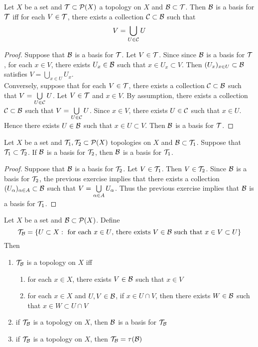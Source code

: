 \documentclass{book}
\begin{document}
	\begin{ex} 
	Let $X$ be a set and $\mathcal{T} \subset \mathcal{P}(X)$ a topology on $X$ and $\mathcal{B} \subset \mathcal{T}$. Then $\mathcal{B}$ is a basis for $\mathcal{T}$ iff for each $V \in \mathcal{T}$, there exists a collection $\mathcal{C} \subset \mathcal{B}$ such that $$V = \bigcup\limits_{U \in \mathcal{C}} U$$
	\end{ex}
	
	\begin{proof}
	Suppose that $\mathcal{B}$ is a basis for $\mathcal{T}$. Let $V \in \mathcal{T}$. Since since $\mathcal{B}$ is a basis for $\mathcal{T}$, for each $x \in V$, there exists $U_x \in \mathcal{B}$ such that $x \in U_x \subset V$. Then $(U_x)_{x \in U} \subset \mathcal{B}$ satisfies $V = \bigcup\limits_{x \in U} U_x$. \\
	Conversely, suppose that for each $V \in \mathcal{T}$, there exists a collection $\mathcal{C} \subset \mathcal{B}$ such that $V = \bigcup\limits_{U \in \mathcal{C}} U$. Let $V \in \mathcal{T}$ and $x \in V$. By assumption, there exists a collection $\mathcal{C} \subset \mathcal{B}$ such that $V = \bigcup\limits_{U \in \mathcal{C}} U$. Since $x \in V$, there exists $U \in \mathcal{C}$ such that $x \in U$. Hence there exists $U \in \mathcal{B}$ such that $x \in U \subset V$. Then $\mathcal{B}$ is a basis for $\mathcal{T}$.
	\end{proof}
	
	\begin{ex} 
	Let $X$ be a set and $\mathcal{T}_1, \mathcal{T}_2 \subset \mathcal{P}(X)$ topologies on $X$ and $\mathcal{B} \subset \mathcal{T}_1$. Suppose that $\mathcal{T}_1 \subset \mathcal{T}_2$. If $\mathcal{B}$ is a basis for $\mathcal{T}_2$, then $\mathcal{B}$ is a basis for $\mathcal{T}_1$.  
	\end{ex}
	
	\begin{proof}
	Suppose that $\mathcal{B}$ is a basis for $\mathcal{T}_2$. Let $V \in \mathcal{T}_1$. Then $V \in \mathcal{T}_2$. Since $\mathcal{B}$ is a basis for $\mathcal{T}_2$, the previous exercise implies that there exists a collection $(U_{\alpha})_{\alpha \in A} \subset \mathcal{B}$ such that $V = \bigcup\limits_{\alpha \in A} U_{\alpha}$. Thus the previous exercise implies that $\mathcal{B}$ is a basis for $\mathcal{T}_1$. 
	\end{proof}
	
	\begin{ex} 
	Let $X$ be a set and $\mathcal{B} \subset \mathcal{P}(X)$. Define 
	$$\mathcal{T}_{\mathcal{B}} = \{ U \subset X: \text{ for each $x \in U$, there exists $V \in \mathcal{B}$ such that $x \in V \subset U$} \}$$ Then 
	\begin{enumerate}
		\item $\mathcal{T}_{\mathcal{B}}$ is a topology on $X$ iff 
		\begin{enumerate}
			\item for each $x \in X$, there exists $V \in \mathcal{B}$ such that $x \in V$
			\item for each $x \in X$ and $U, V \in \mathcal{B}$, if $x \in U \cap V$, then there exists $W \in \mathcal{B}$ such that $x \in W \subset U \cap V$
		\end{enumerate}
		\item if $\mathcal{T}_{\mathcal{B}}$ is a topology on $X$, then $\mathcal{B}$ is a basis for $\mathcal{T}_{\mathcal{B}}$
		\item if $\mathcal{T}_{\mathcal{B}}$ is a topology on $X$, then $\mathcal{T}_{\mathcal{B}} = \tau(\mathcal{B})$
	\end{enumerate}
	\end{ex}
	
\end{document}
